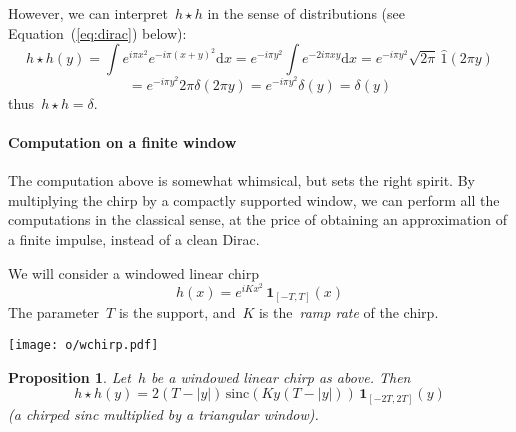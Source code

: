 \documentclass[a4paper]{article}           %
\newtheorem{proposition}[theorem]{Proposition}
\newcommand{\1}{\mathbf{1}}
\newcommand{\ud}{\mathrm{d}}
\newcommand{\abs}[1]{\left|#1\right|}
\newcommand{\paren}[1]{\left(#1\right)}
\begin{document}
However, we can interpret~$h\star h$ in the sense of distributions (see
Equation~(\ref{eq:dirac}) below):
$$
h\star h (y)
=
\int e^{i\pi x^2}e^{-i\pi(x+y)^2}\ud x
=
e^{-i\pi y^2}
\int e^{-2i\pi xy}
\ud x
=
e^{-i\pi y^2}\sqrt{2\pi}\, \widehat{1}\paren{2\pi y}
$$
$$
=
e^{-i\pi y^2}2\pi\delta\paren{2\pi y}
=
e^{-i\pi y^2}\delta(y)
=\delta(y)
$$
thus~$h\star h=\delta$.


\paragraph{Computation on a finite window}
The computation above is somewhat whimsical, but sets the right spirit.  By
multiplying the chirp by a compactly supported window, we can perform all the
computations in the classical sense,  at the price of obtaining an
approximation of a finite impulse, instead of a clean Dirac.

We will consider a windowed linear chirp
$$
h(x)
=
e^{iKx^2}
\,
\1_{[-T,T]}(x)
$$
The parameter~$T$ is the support, and~$K$ is the~\emph{ramp rate}
of the chirp.


\texttt{[image: o/wchirp.pdf]}

\clearpage
\begin{proposition}
	Let~$h$ be a windowed linear chirp as above.  Then
	\[
		h\star h(y)=
		2\paren{T-\abs{y}}
		\,
		\mathrm{sinc}\paren{ Ky\paren{T-\abs{y}} }
		\,
		\1_{[-2T,2T]}(y)
	\]
	(a chirped sinc multiplied by a triangular window).
\end{proposition}
\end{document}
